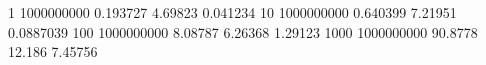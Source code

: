 1 1000000000 0.193727 4.69823 0.041234
10 1000000000 0.640399 7.21951 0.0887039
100 1000000000 8.08787 6.26368 1.29123
1000 1000000000 90.8778 12.186 7.45756
